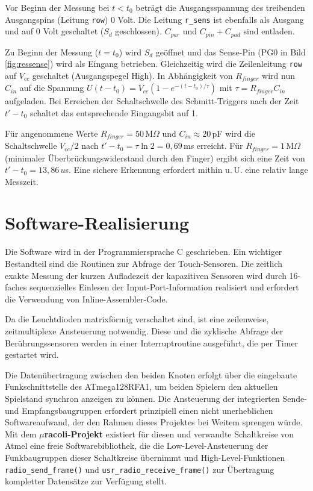 \documentclass{clt2012}
\renewcommand{\figurename}{Bild}
\begin{document}
Vor Beginn der Messung bei $t < t_0$ beträgt die Ausgangsspannung des treibenden Ausgangspins (Leitung \texttt{row}) 0 Volt. Die
Leitung \texttt{r\_sens} ist ebenfalls als Ausgang und auf 0 Volt geschaltet ($S_d$ geschlossen). $C_{par}$ und $C_{pin} + C_{pad}$ sind entladen.

Zu Beginn der Messung ($t = t_0$) wird $S_d$ geöffnet und das Sense-Pin (PG0 in \figurename{} \ref{fig:ressense}) wird als Eingang betrieben. Gleichzeitig wird die
Zeilenleitung \texttt{row} auf $V_{cc}$ geschaltet (Ausgangspegel High). In Abhängigkeit von $R_{finger}$ wird nun $C_{in}$
auf die Spannung $U(t-t_0) = V_{cc} (1 - e^{-(t-t_0)/\tau})$ mit $\tau = R_{finger} C_{in}$ aufgeladen.
Bei Erreichen der Schaltschwelle des Schmitt-Triggers nach der Zeit $t'-t_0$ schaltet das entsprechende Eingangsbit auf 1.

Für angenommene Werte $R_{finger}=50\,$M$\Omega$ und $C_{in} \approx 20$\,pF wird die Schaltschwelle 
$V_{cc}/2$ nach $t'-t_0=\tau \ln 2 = 0,69$\,ms erreicht. Für $R_{finger}=1\,$M$\Omega$ (minimaler Überbrückungswiderstand durch den
Finger) ergibt sich eine Zeit von $t'-t_0=13,86\,u$s. Eine sichere Erkennung erfordert mithin u.\,U. eine relativ lange Messzeit.


\section{Software-Realisierung}

Die Software wird in der Programmiersprache C geschrieben.
Ein wichtiger Bestandteil sind die Routinen zur
Abfrage der Touch-Sensoren. Die zeitlich exakte Messung der kurzen
Aufladezeit der kapazitiven Sensoren wird durch 16-faches sequenzielles
Einlesen der Input-Port-Information realisiert und erfordert die Verwendung von
Inline-Assembler-Code.

Da die Leuchtdioden matrixförmig verschaltet sind, ist eine zeilenweise,
zeitmultiplexe Ansteuerung notwendig. Diese und die zyklische Abfrage
der Berührungssensoren werden in einer Interruptroutine ausgeführt, die per
Timer gestartet wird.


Die Datenübertragung zwischen den beiden Knoten erfolgt über die eingebaute Funk\-schnitt\-stel\-le des
\mbox{ATmega128RFA1}, um beiden Spielern den aktuellen Spielstand synchron anzeigen zu können.
Die Ansteuerung der integrierten Sende- und Empfangsbaugruppen erfordert prinzipiell einen nicht unerheblichen
Softwareaufwand, der den Rahmen dieses Projektes bei Weitem sprengen würde.\newline
Mit dem \textbf{$\mu{}$racoli-Projekt} \cite{uracoli} existiert für
diesen und verwandte Schaltkreise von Atmel eine freie Softwarebibliothek, die die
Low-Level-Ansteuerung der Funkbaugruppen
dieser Schaltkreise übernimmt und High-Level-Funktionen \texttt{radio\_send\_frame()} und
\texttt{usr\_radio\_receive\_frame()} zur Übertragung kompletter Datensätze zur Verfügung stellt.
\end{document}
